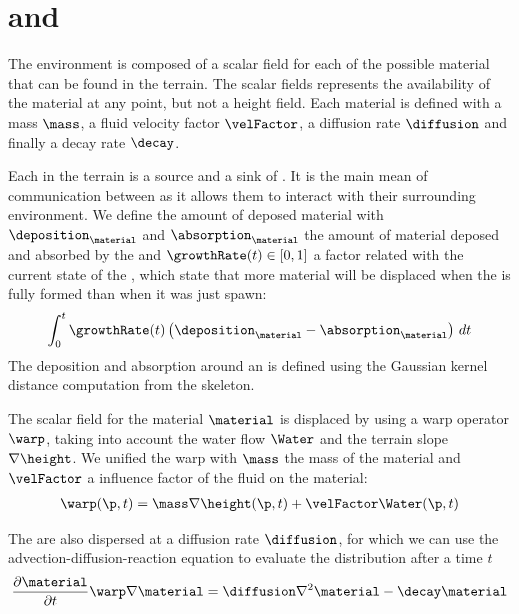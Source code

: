 \section{ and }
\label{sec:semantic-representation_materials}
The environment is composed of a scalar field for each of the possible material that can be found in the terrain. The scalar fields represents the availability of the material at any point, but not a height field. Each material is defined with a mass $\mass$, a fluid velocity factor $\velFactor$, a diffusion rate $\diffusion$ and finally a decay rate $\decay$.

Each  in the terrain is a source and a sink of . It is the main mean of communication between  as it allows them to interact with their surrounding environment. We define the amount of deposed material with $\deposition_\material$ and $\absorption_\material$ the amount of material deposed and absorbed by the  and $\growthRate(t) \in [0, 1]$ a factor related with the current state of the , which state that more material will be displaced when the  is fully formed than when it was just spawn:
\begin{align*}
    \int_{0}^{t} {\growthRate(t) \left( \deposition_\material - \absorption_\material \right) \,dt}
\end{align*} 
The deposition and absorption around an  is defined using the Gaussian kernel distance computation from the skeleton.

The scalar field for the material $\material$ is displaced by using a warp operator $\warp$, taking into account the water flow $\Water$ and the terrain slope $\nabla \height$. We unified the warp with $\mass$ the mass of the material and $\velFactor$ a influence factor of the fluid on the material: 
\begin{align*}
    \warp(\p, t) = \mass \nabla \height(\p, t) + \velFactor \Water(\p, t)
\end{align*}
 
The  are also dispersed at a diffusion rate $\diffusion$, for which we can use the advection-diffusion-reaction equation to evaluate the distribution after a time $t$
\begin{align} 
	\label{eq:material-displacement-equation}
    \frac{\partial \material}{\partial t} \warp \nabla \material = \diffusion \nabla^2 \material - \decay \material
\end{align}


